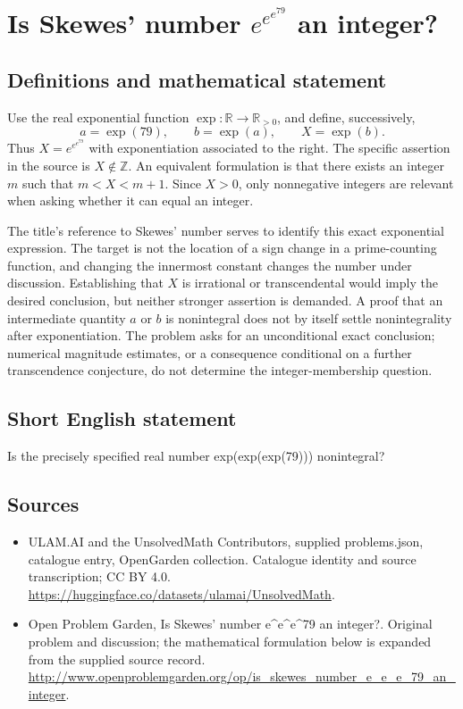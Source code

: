 \documentclass[11pt,a4paper]{article}
\begin{document}
\section*{Is Skewes' number $e^{e^{e^{79}}}$ an integer?}\label{statement}

\subsection{Definitions and mathematical statement}
Use the real exponential function $\exp:\mathbb R\to\mathbb R_{>0}$,
and define, successively,
\[
 a=\exp(79),\qquad b=\exp(a),\qquad X=\exp(b).
\]
Thus $X=e^{e^{e^{79}}}$ with exponentiation associated to the right.
The specific assertion in the source is $X\notin\mathbb Z$. An
equivalent formulation is that there exists an integer $m$ such that
$m<X<m+1$. Since $X>0$, only nonnegative integers are relevant when
asking whether it can equal an integer.

The title's reference to Skewes' number serves to identify this exact
exponential expression. The target is not the location of a sign
change in a prime-counting function, and changing the innermost
constant changes the number under discussion. Establishing that $X$
is irrational or transcendental would imply the desired conclusion,
but neither stronger assertion is demanded. A proof that an
intermediate quantity $a$ or $b$ is nonintegral does not by itself
settle nonintegrality after exponentiation. The problem asks for an
unconditional exact conclusion; numerical magnitude estimates, or
a consequence conditional on a further transcendence conjecture,
do not determine the integer-membership question.
\subsection{Short English statement}
Is the precisely specified real number exp(exp(exp(79))) nonintegral?
\subsection{Sources}
\begin{itemize}
\item[S1] ULAM.AI and the UnsolvedMath Contributors, supplied problems.json, catalogue entry, OpenGarden collection. Catalogue identity and source transcription; CC BY 4.0.
\url{https://huggingface.co/datasets/ulamai/UnsolvedMath}.
\item[S2] Open Problem Garden, Is Skewes' number e\textasciicircum{}e\textasciicircum{}e\textasciicircum{}79 an integer?. Original problem and discussion; the mathematical formulation below is expanded from the supplied source record.
\url{http://www.openproblemgarden.org/op/is_skewes_number_e_e_e_79_an_integer}.
\end{itemize}
\end{document}
